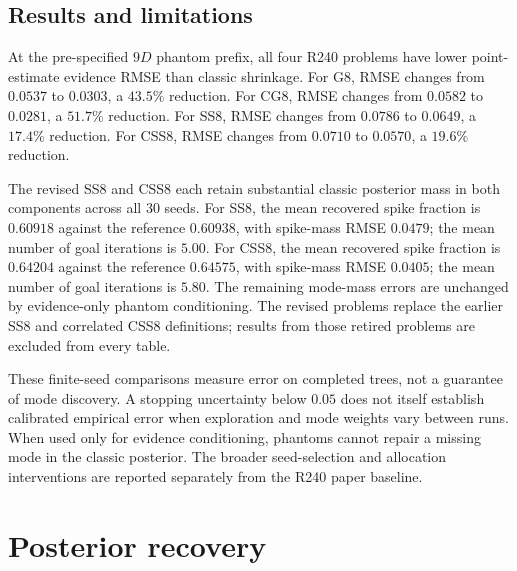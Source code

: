 \documentclass[pdflatex,sn-basic,icol]{sn-jnl}
\theoremstyle{plain}
\theoremstyle{definition}
\begin{document}
\clearpage
\subsection{Results and limitations}

At the pre-specified $9D$ phantom prefix, all four R240 problems have lower point-estimate evidence RMSE than classic shrinkage.
For G8, RMSE changes from $0.0537$ to $0.0303$, a $43.5\%$ reduction.
For CG8, RMSE changes from $0.0582$ to $0.0281$, a $51.7\%$ reduction.
For SS8, RMSE changes from $0.0786$ to $0.0649$, a $17.4\%$ reduction.
For CSS8, RMSE changes from $0.0710$ to $0.0570$, a $19.6\%$ reduction.

The revised SS8 and CSS8 each retain substantial classic posterior mass in both components across all 30 seeds.
For SS8, the mean recovered spike fraction is $0.60918$ against the reference $0.60938$, with spike-mass RMSE $0.0479$; the mean number of goal iterations is $5.00$.
For CSS8, the mean recovered spike fraction is $0.64204$ against the reference $0.64575$, with spike-mass RMSE $0.0405$; the mean number of goal iterations is $5.80$.
The remaining mode-mass errors are unchanged by evidence-only phantom conditioning.
The revised problems replace the earlier SS8 and correlated CSS8 definitions; results from those retired problems are excluded from every table.

These finite-seed comparisons measure error on completed trees, not a guarantee of mode discovery. A stopping uncertainty below $0.05$ does not itself establish calibrated empirical error when exploration and mode weights vary between runs.
When used only for evidence conditioning, phantoms cannot repair a missing mode in the classic posterior. The broader seed-selection and allocation interventions are reported separately from the R240 paper baseline.


\section{Posterior recovery}\label{sec:posterior_recovery}
\end{document}

